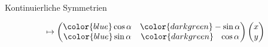 \begin{frame}[t]
\begin{columns}[t,onlytextwidth]
\begin{column}{0.48\textwidth}
{\begin{block}{Kontinuierliche Symmetrien}
\begin{itemize}
\[{\mapsto
\begin{pmatrix}
{\color{blue}\cos\alpha}&{\color{darkgreen}-\sin\alpha}\\
{\color{blue}\sin\alpha}&{\color{darkgreen}\phantom{-}\cos\alpha}
\end{pmatrix}
\begin{pmatrix}x\\y\end{pmatrix}
}
\]
\end{itemize}
\end{block}}
\vspace{-10pt}
\end{column}
\end{columns}
\end{frame}
\egroup
